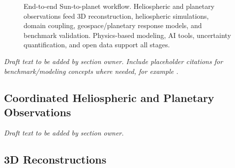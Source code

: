 \documentclass[
  draft
]{agujournal2025}
\begin{document}
\begin{figure}[h]
\centering
{}
\caption{End-to-end Sun-to-planet workflow. Heliospheric and planetary observations feed 3D reconstruction, heliospheric simulations, domain coupling, geospace/planetary response models, and benchmark validation. Physics-based modeling, AI tools, uncertainty quantification, and open data support all stages.}
\label{fig:end-to-end-workflow}
\end{figure}

\noindent\textit{Draft text to be added by section owner. Include placeholder citations for benchmark/modeling concepts where needed, for example \cite{placeholder-benchmark}.}

\subsection{Coordinated Heliospheric and Planetary Observations}

\noindent\textit{Draft text to be added by section owner.}

\subsection{3D Reconstructions}
\end{document}
